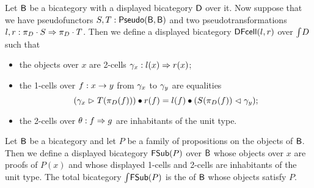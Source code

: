 \begin{example}
\label{ex:DCell}
Let $\mathsf{B}$ be a bicategory with a displayed bicategory $\mathsf{D}$ over it.
Now suppose that we have pseudofunctors $S, T : \mathsf{Pseudo}(\mathsf{B}, \mathsf{B})$ and two pseudotransformations $l, r : \pi_{D} \cdot S \Rightarrow \pi_{D} \cdot T$.
Then we define a displayed bicategory $\mathsf{DFcell}(l,r)$ over $\textstyle \int_{}{D}$ such that
\begin{itemize}
	\item the objects over $x$ are 2-cells $\gamma_x : l(x) \Rightarrow r(x)$;
	\item the 1-cells over $f : x \rightarrow y$ from $\gamma_x$ to $\gamma_y$ are equalities
	\[
	(\gamma_x \vartriangleright T(\pi_{D}(f))) \bullet r(f)
	=
	l(f) \bullet (S(\pi_{D}(f)) \vartriangleleft \gamma_y);
	\]
	\item the 2-cells over $\theta : f \Rightarrow g$ are inhabitants of the unit type.
\end{itemize}
\end{example}

\begin{example}
\label{ex:fullsub}
Let $\mathsf{B}$ be a bicategory and let $P$ be a family of propositions on the objects of $\mathsf{B}$.
Then we define a displayed bicategory $\mathsf{FSub}(P)$ over $\mathsf{B}$ whose objects over $x$ are proofs of $P(x)$
and whose displayed 1-cells and 2-cells are inhabitants of the unit type.
The total bicategory $\textstyle \int_{}{\mathsf{FSub}(P)}$ is the  of $\mathsf{B}$ whose objects satisfy $P$.
\end{example}